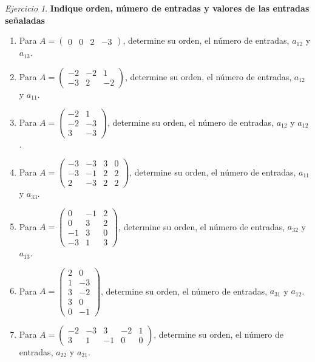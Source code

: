 \documentclass[12pt]{article}
\theoremstyle{remark}
\newtheorem{Ejer}[definicion]{Ejercicio}
\begin{document}
\begin{Ejer}
\textbf{Indique orden, número de entradas y valores de las entradas señaladas}
\begin{enumerate}[start=35]

\item Para $A=\begin{pmatrix}0&0&2&-3\end{pmatrix}$, determine su orden, el número de entradas, $a_{12}$ y $a_{13}$.

\item Para $A=\begin{pmatrix}-2&-2&1\\-3&2&-2\end{pmatrix}$, determine su orden, el número de entradas, $a_{12}$ y $a_{11}$.

\item Para $A=\begin{pmatrix}-2&1\\-2&-3\\3&-3\end{pmatrix}$, determine su orden, el número de entradas, $a_{12}$ y $a_{12}$.

\item Para $A=\begin{pmatrix}-3&-3&3&0\\-3&-1&2&2\\2&-3&2&2\end{pmatrix}$, determine su orden, el número de entradas, $a_{11}$ y $a_{33}$.

\item Para $A=\begin{pmatrix}0&-1&2\\0&3&2\\-1&3&0\\-3&1&3\end{pmatrix}$, determine su orden, el número de entradas, $a_{32}$ y $a_{13}$.

\item Para $A=\begin{pmatrix}2&0\\1&-3\\3&-2\\3&0\\0&-1\end{pmatrix}$, determine su orden, el número de entradas, $a_{31}$ y $a_{12}$.

\item Para $A=\begin{pmatrix}-2&-3&3&-2&1\\3&1&-1&0&0\end{pmatrix}$, determine su orden, el número de entradas, $a_{22}$ y $a_{21}$.


\end{enumerate}
\end{Ejer}
\end{document}
